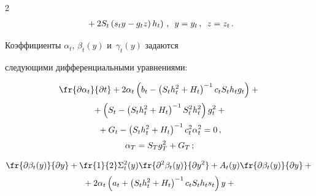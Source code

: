 \begin{multicols}{2}
\begin{multline}
\left.{}+2S_t \left( s_t y-g_t z\right) h_t\right)\,,\enskip


y=y_t\,,\enskip z=z_t\,.


\label{e5-b}


\end{multline}


     


     Коэффициенты $\alpha_t$, $\beta_t(y)$ и~$\gamma_t(y)$ задаются 


следующими дифференциальными уравнениями:


     \begin{multline}


     \fr


{\partial \alpha_t}{\partial t}+


2\alpha_t


     \left( b_t-\left( S_t h_t^2+H_t\right)^{-1} c_t S_t h_t g_t\right)+{}\\[2pt]


     {}+\left( S_t-\left( S_t h_t^2+H_t\right)^{-1} S_t^2 h_t^2\right) g_t^2+{}\\[2pt]


     {}+G_t-


     \left( S_t h_t^2+H_t\right)^{-1} c_t^2 \alpha_t^2=0\,,\\[2pt]


     \alpha_T=S_T g_T^2+G_T\,;


     \label{e6-b}


     \end{multline}





\vspace*{-12pt}





\noindent


\begin{multline}


\fr{\partial \beta_t(y)}{\partial y}+\fr{1}{2}\Sigma_t^2(y)


\fr{\partial^2\beta_t(y)}{\partial y^2} 


+A_t(y)\fr{\partial \beta_t(y)}{\partial y}+{}\\[2pt]


{}+2\alpha_t\left( a_t+\left( S_t h_t^2+H_t\right)^{-1} c_t S_t h_t 


s_t\right)y+{}\\[2pt]



\end{multline}
\end{multicols}
